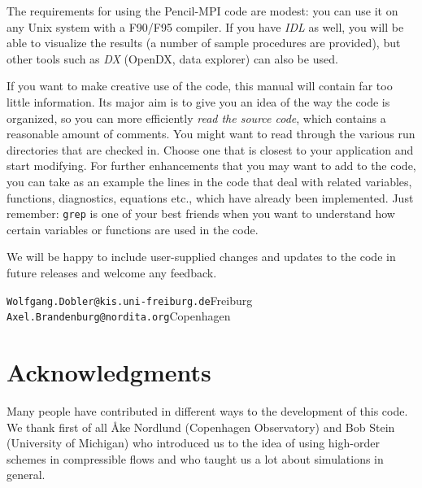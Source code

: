 \documentclass[\mydriver,12pt,twoside,notitlepage,a4paper]{article}
\makeatletter
\newcommand{\code}[1]{\texttt{#1}}
\newcommand{\cmd}{\command}
\newcommand{\email}[1]{\code{#1}}
\newcommand{\command}[2][]{%
  \def\index@{#1}%
  \code{#2}%
  \ifx\index@\@empty\index{#2@\emph{#2}}%
  \else\index{#1@\emph{#1}}%
  \fi%
}
\newcommand{\name}[2][]{%
  \def\index@{#1}%
  \textsl{#2\/}%
  \ifx\index@\@empty\index{#2@\MakeUppercase #2}%
  \else\index{#1}%
  \fi%
}
\makeatother
\begin{document}
The requirements for using the Pencil-MPI code are modest: you can use it
on any Unix system with a F90/F95 compiler. If you have \name{IDL} as
well, you will be able to visualize the results (a number of sample
procedures are provided), but other tools such as
\name{DX} (OpenDX, data explorer) can also be used.

\bigskip

If you want to make creative use of the code, this manual will contain far
too little information.
Its major aim is to give you an idea of the way the code is organized, so
you can more efficiently \emph{read the source code}, which contains a
reasonable amount of comments.
You might want to read through the various run directories that are checked in.
Choose one that is closest to your application and start modifying.
For further enhancements that you may want to add to the code, you can
take as an example the lines in the code that deal with related variables,
functions, diagnostics, equations etc., which have already been implemented.
Just remember: \cmd{grep} is one of your best friends when you want to
understand how certain variables or functions are used in the code.

\bigskip

We will be happy to include user-supplied changes and updates to the code
in future releases and welcome any feedback.

\vspace{5mm}
\email{Wolfgang.Dobler@kis.uni-freiburg.de}\hfill Freiburg\\
\email{Axel.Brandenburg@nordita.org}\hfill Copenhagen



\section*{Acknowledgments}

Many people have contributed in different ways to the development of this
code. We thank first of all {\AA}ke Nordlund (Copenhagen Observatory)
and Bob Stein (University of Michigan) who introduced us to the idea of
using high-order schemes in compressible flows and who taught us a lot
about simulations in general.
\end{document}
